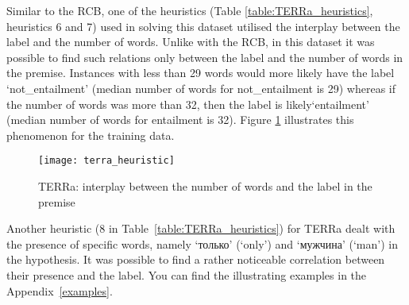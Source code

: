 \documentclass[11pt]{article}
\begin{document}
Similar to the RCB, one of the heuristics (Table \ref{table:TERRa_heuristics}, heuristics 6 and 7) used in solving this dataset utilised the interplay between the label and the number of words. Unlike with the RCB, in this dataset it was possible to find such relations only between the label and the number of words in the premise. 
Instances with less than 29 words would more likely have the label `not\_entailment' (median number of words for not\_entailment is 29) whereas if the number of words was more than 32, then the label is likely`entailment' (median number of words for entailment is 32).  
Figure \ref{fig:TERRa_numberofwords} illustrates this phenomenon for the training data.

\begin{figure}[ht]
\begin{center}
\texttt{[image: terra\_heuristic]}

\end{center}
\caption{TERRa: interplay between the number of words and the label in the premise}
\label{fig:TERRa_numberofwords}
\end{figure}


Another heuristic (8 in Table~\ref{table:TERRa_heuristics}) for TERRa dealt with the presence of specific words, namely \foreignlanguage{russian}{`только'} (`only') and \foreignlanguage{russian}{`мужчина'} (`man') in the hypothesis. It was possible to find a rather noticeable correlation between their presence and the label. You can find the illustrating examples in the Appendix~\ref{examples}.
\end{document}

